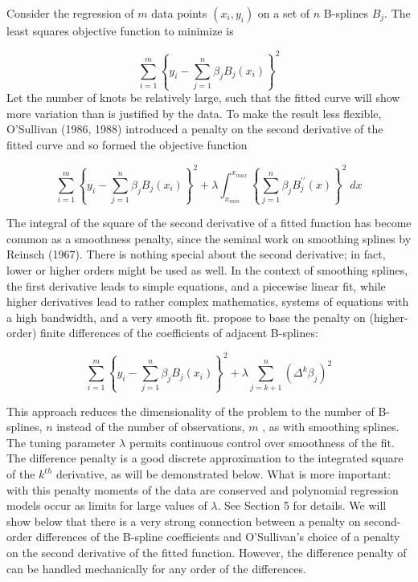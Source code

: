 \documentclass[12pt]{article}
\newcommand*\needsparaphrased{\color{red}}
\begin{document}
Consider the regression of $m$ data points $\left(x_i,y_i\right)$ on a set of $n$ B-splines $B_j$. The least squares objective function to minimize is

\begin{equation} \label{eq:univariate_bspline_SSE}
\sum_{i=1}^m \left\{ y_i - \sum_{j=1}^n \beta_j B_j\left(x_i\right) \right\}^2
\end{equation}
\noindent
{ \needsparaphrased Let the number of knots be relatively large, such that the fitted curve will show more variation than is justified by the data. To make the result less flexible, O'Sullivan (1986, 1988) introduced a penalty on the second derivative of the fitted curve and so formed the objective function}

\begin{equation} \label{eq:univariate_bspline_ridge_penalty}
\sum_{i=1}^m \left \{ y_i - \sum_{j=1}^n \beta_j B_j\left(x_i\right) \right \}^2 + \lambda \int_{x_{min}}^{x_{max}} \left\{  \sum_{j=1}^n \beta_j B^{\prime \prime}_j\left(x\right) \right\}^2 \; dx
\end{equation}

{ \needsparaphrased The integral of the square of the second derivative of a fitted function has become common as a smoothness penalty, since the seminal work on smoothing splines by Reinsch (1967). There is nothing special about the second derivative; in fact, lower or higher orders might be used as well. In the context of smoothing splines, the first derivative leads to simple equations, and a piecewise linear fit, while higher derivatives lead to rather complex mathematics, systems of equations with a high bandwidth, and a very smooth fit. \cite{eilers1996flexible} propose to base the penalty on (higher-order) finite differences of the coefficients of adjacent B-splines:}

\begin{equation} \label{eq:univariate_pspline_diff_penalty}
\sum_{i=1}^m \left \{ y_i - \sum_{j=1}^n \beta_j B_j\left(x_i\right) \right \}^2 + \lambda \sum_{j=k+1}^n \left( \Delta^k \beta_j  \right)^2
\end{equation}

This approach reduces the dimensionality of the problem to the number of B-splines, $n$ instead of the number of observations, $m$ , as with smoothing splines. The tuning parameter $\lambda$ permits continuous control over smoothness of the fit. The difference penalty is a good discrete approximation to the integrated square of the $k^{th}$ derivative, as will be demonstrated below. { \needsparaphrased  What is more important: with this penalty moments of the data are conserved and polynomial regression models occur as limits for large values of $\lambda$. See Section 5 for details. We will show below that there is a very strong connection between a penalty on second-order differences of the B-spline coefficients and O'Sullivan's choice of a penalty on the second derivative of the fitted function. However, the difference penalty of \cite{eilers1996flexible} can be handled mechanically for any order of the differences.}
\end{document}
